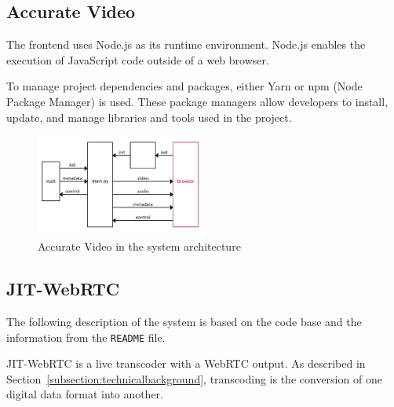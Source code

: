 \documentclass[../MasterThesis.tex]{subfiles}
\begin{document}
\subsection{Accurate Video} \label{subsection:accuratevideo}


The frontend uses Node.js as its runtime environment. Node.js enables the execution of JavaScript code outside of a web browser.~\cite{nodejs, RM_Frontend, ap3_docs}

To manage project dependencies and packages, either Yarn or npm (Node Package Manager) is used. These package managers allow developers to install, update, and manage libraries and tools used in the project.~\cite{RM_Frontend, npmyarn}


\begin{figure}[H]
	\centering
	\includegraphics[width=0.5\textwidth]{IM_FE.png}
	\caption{Accurate Video in the system architecture}
\end{figure}













\subsection{JIT-WebRTC} \label{subsection:jit-webrtc}

The following description of the system is based on the code base and the information from the \texttt{README} file.~\cite{RM_Backend}

JIT-WebRTC is a live transcoder with a WebRTC output. As described in Section~\ref{subsection:technicalbackground}, transcoding is the conversion of one digital data format into another.~\cite{transcoding}
\end{document}
